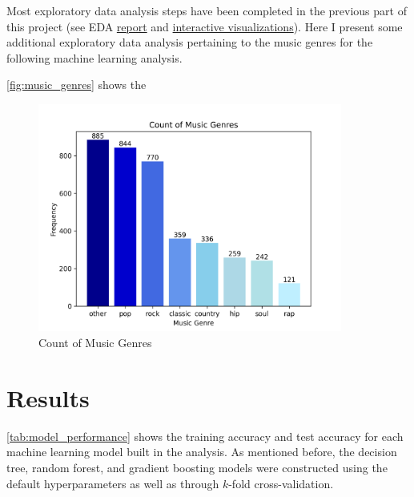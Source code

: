 \documentclass{article}
\begin{document}
Most exploratory data analysis steps have been completed in the previous part of this project (see EDA \href{https://github.com/BullDF/billboard-songs-analysis-with-spotify/blob/main/EDA/report.pdf}{report} and \href{https://bulldf.github.io/billboard-songs-analysis-with-spotify/EDA.html}{interactive visualizations}). Here I present some additional exploratory data analysis pertaining to the music genres for the following machine learning analysis.

\autoref{fig:music_genres} shows the 

\begin{figure}[htbp]
    \centering
    \includegraphics[width=10cm]{count_of_music_genres.png}
    \caption{Count of Music Genres}
    \label{fig:music_genres}
\end{figure}

\section{Results}

\autoref{tab:model_performance} shows the training accuracy and test accuracy for each machine learning model built in the analysis. As mentioned before, the decision tree, random forest, and gradient boosting models were constructed using the default hyperparameters as well as through \(k\)-fold cross-validation. 
\end{document}
